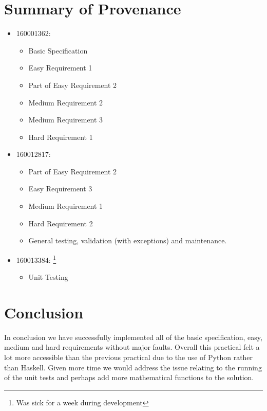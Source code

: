 \documentclass[11]{article}
\begin{document}
	\section{Summary of Provenance}
			\begin{itemize}
				\item 160001362:
					\begin{itemize}
						\item Basic Specification
						\item Easy Requirement 1
						\item Part of Easy Requirement 2
						\item Medium Requirement 2
						\item Medium Requirement 3
						\item Hard Requirement 1
					\end{itemize}
					
				\item 160012817:
					\begin{itemize}
						\item Part of Easy Requirement 2
						\item Easy Requirement 3
						\item Medium Requirement 1
						\item Hard Requirement 2
						\item General testing, validation (with exceptions) and maintenance.
					\end{itemize}
					
				\item 160013384: \footnote{Was sick for a week during development}
					\begin{itemize}
						\item Unit Testing 
					\end{itemize}
			\end{itemize}
				
	
\section{Conclusion}
In conclusion we have successfully implemented all of the basic specification, easy, medium and hard requirements without major faults. Overall this practical felt a lot more accessible than the previous practical due to the use of Python rather than Haskell. Given more time we would address the issue relating to the running of the unit tests and perhaps add more mathematical functions to the solution.
\end{document}
